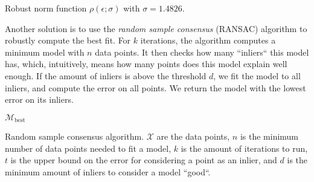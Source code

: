 \begin{marginfigure}[-5cm]

    \caption{Robust norm function $\rho(\epsilon;\sigma)$ with $\sigma=1.4826$.}
    \label{fig:robust-norm}
\end{marginfigure}

Another solution is to use the \textit{random sample consensus} (RANSAC)
algorithm to robustly compute the best fit. For $k$ iterations, the algorithm
computes a minimum model with $n$ data points. It then checks how many
``inliers`` this model has, which, intuitively, means how many points does this
model explain well enough. If the amount of inliers is above the threshold $d$,
we fit the model to all inliers, and compute the error on all points. We return
the model with the lowest error on its inliers.

\begin{algorithm}
    \begin{algorithmic}
        \State {$\epsilon_{\min} \gets \infty$}

        \If {$\epsilon < \epsilon_{\min}$}
        \EndIf
        \EndIf
        \End
        \Return $\mathcal{M}_{\mathrm{best}}$
        \EndFunction
    \end{algorithmic}
    \caption{Random sample consensus algorithm. $\mathcal{X}$ are the data points, $n$ is the minimum number of data points needed to fit a model, $k$ is the amount of iterations to run, $t$ is the upper bound on the error for considering a point as an inlier, and $d$ is the minimum amount of inliers to consider a model ``good``.}
\end{algorithm}

